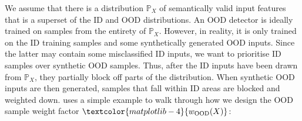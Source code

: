 We assume that there is a distribution $\mathbb{P}_{X}$ of semantically valid input features that is a superset of the ID and OOD distributions. An OOD detector is ideally trained on samples from the entirety of $\mathbb{P}_{X}$. However, in reality, it is only trained on the ID training samples and some synthetically generated OOD inputs. Since the latter may contain some misclassified ID inputs, we want to prioritise ID samples over synthetic OOD samples. Thus, after the ID inputs have been drawn from $\mathbb{P}_{X}$, they partially block off parts of the distribution. When synthetic OOD inputs are then generated, samples that fall within ID areas are blocked and weighted down.  uses a simple example to walk through how we design the OOD sample weight factor $\textcolor{matplotlib-4}{w_{\text{OOD}}(X)}$:

